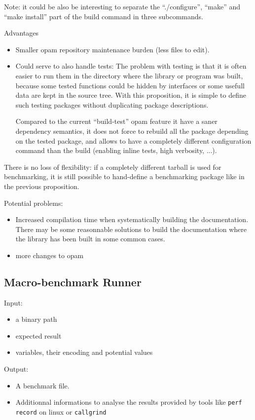 \documentclass[11pt,a4paper]{article}
\begin{document}
Note: it could be also be interesting to separate the ``./configure'',
``make'' and ``make install'' part of the build command in three
subcommands.

Advantages
\begin{itemize}
\item Smaller opam repository maintenance burden (less files to edit).
\item Could serve to also handle tests: The problem with testing is
  that it is often easier to run them in the directory where the
  library or program was built, because some tested functions could be
  hidden by interfaces or some usefull data are kept in the source
  tree. With this proposition, it is simple to define such testing
  packages without duplicating package descriptions.

  Compared to the current ``build-test'' opam feature it have a saner
  dependency semantics, it does not force to rebuild all the package
  depending on the tested package, and allows to have a completely
  different configuration command than the build (enabling inline
  tests, high verbosity, ...).
\end{itemize}

There is no loss of flexibility: if a completely different tarball is
used for benchmarking, it is still possible to hand-define a
benchmarking package like in the previous proposition.

Potential problems:
\begin{itemize}
\item Increased compilation time when systematically building the
  documentation. There may be some reasonnable solutions to build the
  documentation where the library has been built in some common cases.
\item more changes to opam
\end{itemize}

\subsection{Macro-benchmark Runner}

Input:
\begin{itemize}
\item a binary path
\item expected result
\item variables, their encoding and potential values
\end{itemize}

Output:
\begin{itemize}
\item A benchmark file.
\item Additionnal informations to analyse the results provided by
  tools like \texttt{perf record} on linux or \texttt{callgrind}
\end{itemize}
\end{document}

